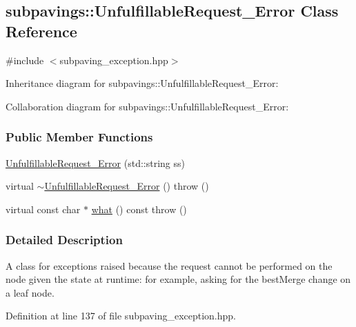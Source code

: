 \hypertarget{classsubpavings_1_1UnfulfillableRequest__Error}{\subsection{subpavings\-:\-:\-Unfulfillable\-Request\-\_\-\-Error \-Class \-Reference}
\label{classsubpavings_1_1UnfulfillableRequest__Error}
}


{\ttfamily \#include $<$subpaving\-\_\-exception.\-hpp$>$}



\-Inheritance diagram for subpavings\-:\-:\-Unfulfillable\-Request\-\_\-\-Error\-:


\-Collaboration diagram for subpavings\-:\-:\-Unfulfillable\-Request\-\_\-\-Error\-:
\subsubsection*{\-Public \-Member \-Functions}
\begin{DoxyCompactItemize}
\item 
\hyperlink{classsubpavings_1_1UnfulfillableRequest__Error_a0fcbdae92e71b37ed6deee662530cf03}{\-Unfulfillable\-Request\-\_\-\-Error} (std\-::string ss)
\item 
virtual \hyperlink{classsubpavings_1_1UnfulfillableRequest__Error_a4fc892e33b3bd7ba588699eae05b2456}{$\sim$\-Unfulfillable\-Request\-\_\-\-Error} ()  throw ()
\item 
virtual const char $\ast$ \hyperlink{classsubpavings_1_1UnfulfillableRequest__Error_af4aa30be9e58e15be1605162f595cb95}{what} () const   throw ()
\end{DoxyCompactItemize}


\subsubsection{\-Detailed \-Description}
\-A class for exceptions raised because the request cannot be performed on the node given the state at runtime\-: for example, asking for the best\-Merge change on a leaf node. 

\-Definition at line 137 of file subpaving\-\_\-exception.\-hpp.




